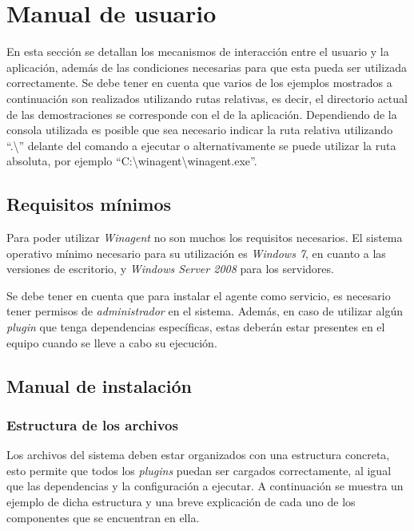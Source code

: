 \section{Manual de usuario} \label{sec:man}
    En esta sección se detallan los mecanismos de interacción entre el usuario y la aplicación, además de las condiciones necesarias para que esta pueda ser utilizada correctamente. Se debe tener en cuenta que varios de los ejemplos mostrados a continuación son realizados utilizando rutas relativas, es decir, el directorio actual de las demostraciones se corresponde con el de la aplicación. Dependiendo de la consola utilizada es posible que sea necesario indicar la ruta relativa utilizando ``.\textbackslash'' delante del comando a ejecutar o alternativamente se puede utilizar la ruta absoluta, por ejemplo ``C:\textbackslash{}winagent\textbackslash{}winagent.exe''. 

    \subsection{Requisitos mínimos}
        Para poder utilizar \textit{Winagent} no son muchos los requisitos necesarios. El sistema operativo mínimo necesario para su utilización es \textit{Windows 7}, en cuanto a las versiones de escritorio, y \textit{Windows Server 2008} para los servidores.
        
        Se debe tener en cuenta que para instalar el agente como servicio, es necesario tener permisos de \textit{administrador} en el sistema. Además, en caso de utilizar algún \textit{plugin} que tenga dependencias específicas, estas deberán estar presentes en el equipo cuando se lleve a cabo su ejecución.
        
    \subsection{Manual de instalación}
        \subsubsection{Estructura de los archivos}
            Los archivos del sistema deben estar organizados con una estructura concreta, esto permite que todos los \textit{plugins} puedan ser cargados correctamente, al igual que las dependencias y la configuración a ejecutar. A continuación se muestra un ejemplo de dicha estructura y una breve explicación de cada uno de los componentes que se encuentran en ella.\\
            
